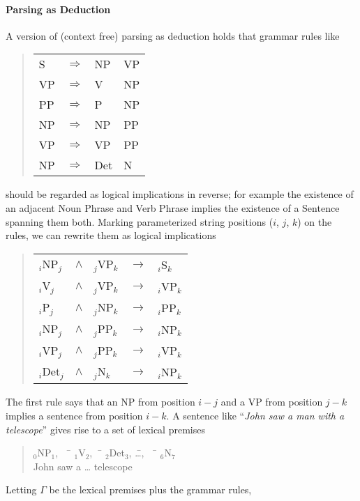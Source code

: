 \paragraph{Parsing as Deduction}
A version of (context free) parsing as deduction holds that grammar
rules like
\begin{quote}
\begin{tabular}{llll}
S & $\Rightarrow$ & NP & VP\\
VP & $\Rightarrow$ & V & NP\\
PP & $\Rightarrow$ & P & NP\\
NP & $\Rightarrow$ & NP & PP\\
VP & $\Rightarrow$ & VP & PP\\
NP & $\Rightarrow$ & Det & N
\end{tabular}
\end{quote}
should be regarded as logical implications in reverse; for example the
existence of an adjacent Noun Phrase and Verb Phrase implies the
existence of a Sentence spanning them both.  Marking parameterized
string positions ($i$, $j$, $k$) on the rules, we can rewrite them as logical
implications
\begin{quote}
\begin{tabular}{lllll}
$_i$NP$_j$ &$\wedge$& $_j$VP$_k$ & $\rightarrow$ & $_i$S$_k$\\
$_i$V$_j$ &$\wedge$& $_j$VP$_k$ & $\rightarrow$ & $_i$VP$_k$\\
$_i$P$_j$ &$\wedge$& $_j$NP$_k$ & $\rightarrow$ & $_i$PP$_k$\\
$_i$NP$_j$ &$\wedge$& $_j$PP$_k$ & $\rightarrow$ & $_i$NP$_k$\\
$_i$VP$_j$ &$\wedge$& $_j$PP$_k$ & $\rightarrow$ & $_i$VP$_k$\\
$_i$Det$_j$ &$\wedge$& $_j$N$_k$ & $\rightarrow$ & $_i$NP$_k$
\end{tabular}
\end{quote}
The first rule says that an NP from position $i-j$ and a VP from
position $j-k$ implies a sentence from position $i-k$.
A sentence like ``{\it John saw a man with a telescope}'' gives
rise to a set of lexical premises
\begin{quote}
\begin{tabbing}
$_0$NP$_1$, \ \ \= $_1$V$_2$,\ \  \= $_2$Det$_3$, \= \ldots, \ \ \= $_6$N$_7$\\
John        \> saw        \> a           \> \ldots  \> telescope
\end{tabbing}
\end{quote}
Letting $\Gamma$ be the lexical premises plus the grammar rules,
